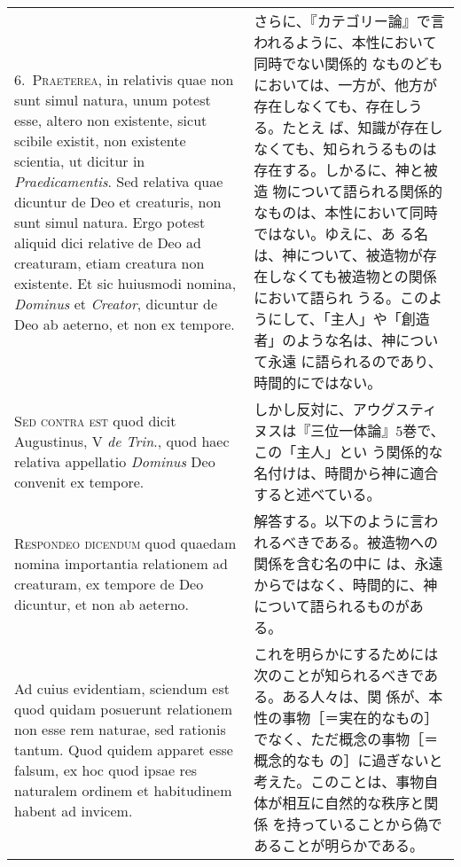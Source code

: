\documentclass[10pt]{jsarticle}
\begin{document}
\begin{longtable}{p{21em}p{21em}}
\\

6.~{\scshape Praeterea}, in relativis quae non sunt simul natura, unum
potest esse, altero non existente, sicut scibile existit, non
existente scientia, ut dicitur in {\itshape Praedicamentis}. Sed
relativa quae dicuntur de Deo et creaturis, non sunt simul
natura. Ergo potest aliquid dici relative de Deo ad creaturam, etiam
creatura non existente. Et sic huiusmodi nomina, {\itshape Dominus} et
{\itshape Creator}, dicuntur de Deo ab aeterno, et non ex tempore.

&

さらに、『カテゴリー論』で言われるように、本性において同時でない関係的
なものどもにおいては、一方が、他方が存在しなくても、存在しうる。たとえ
ば、知識が存在しなくても、知られうるものは存在する。しかるに、神と被造
物について語られる関係的なものは、本性において同時ではない。ゆえに、あ
る名は、神について、被造物が存在しなくても被造物との関係において語られ
うる。このようにして、「主人」や「創造者」のような名は、神について永遠
に語られるのであり、時間的にではない。

\\

{\scshape Sed contra est} quod dicit Augustinus, V {\itshape de
Trin}., quod haec relativa appellatio {\itshape Dominus} Deo convenit
ex tempore.

&

しかし反対に、アウグスティヌスは『三位一体論』5巻で、この「主人」とい
う関係的な名付けは、時間から神に適合すると述べている。

\\

{\scshape Respondeo dicendum} quod quaedam nomina importantia
relationem ad creaturam, ex tempore de Deo dicuntur, et non ab
aeterno.

&

解答する。以下のように言われるべきである。被造物への関係を含む名の中に
は、永遠からではなく、時間的に、神について語られるものがある。

\\

Ad cuius evidentiam, sciendum est quod quidam posuerunt relationem non
esse rem naturae, sed rationis tantum. Quod quidem apparet esse
falsum, ex hoc quod ipsae res naturalem ordinem et habitudinem habent
ad invicem.

&

これを明らかにするためには次のことが知られるべきである。ある人々は、関
係が、本性の事物［＝実在的なもの］でなく、ただ概念の事物［＝概念的なも
の］に過ぎないと考えた。このことは、事物自体が相互に自然的な秩序と関係
を持っていることから偽であることが明らかである。


\end{longtable}
\end{document}
